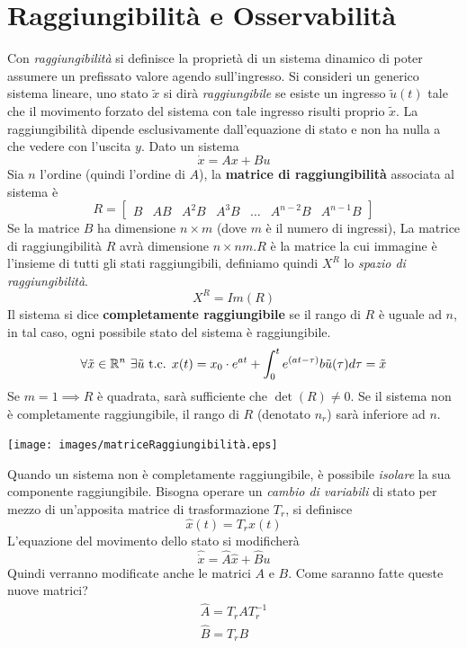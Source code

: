 \documentclass[10pt, letterpaper]{report}
\begin{document}
\section{Raggiungibilità e Osservabilità}
 Con \textit{raggiungibilità} si definisce la proprietà di un sistema dinamico 
di poter assumere un prefissato valore agendo sull'ingresso. \acc 
Si consideri un generico sistema lineare, uno stato $\tilde x$ si dirà \textit{raggiungibile} se 
esiste un ingresso $\tilde u(t)$ tale che il movimento forzato del sistema con tale 
ingresso risulti proprio $\tilde x$. La raggiungibilità dipende esclusivamente dall'equazione di stato e non ha 
nulla a che vedere con l'uscita $y$.\acc 
Dato un sistema $$ \dot{x}=Ax+Bu$$
Sia $n$ l'ordine (quindi l'ordine di $A$), la \textbf{matrice di raggiungibilità} associata al sistema è 
$$ R=\begin{bmatrix}
    B&AB&A^2B&A^3 B &\dots & A^{n-2}B & A^{n-1}B
\end{bmatrix}$$
Se la matrice $B$ ha dimensione $n\times m$ (dove $m$ è il numero di 
ingressi), La matrice di raggiungibilità $R$ avrà dimensione $n\times nm$.$R$ è la matrice 
la cui immagine è l'insieme di tutti gli stati raggiungibili, definiamo quindi $X^R$ lo \textit{spazio di 
raggiungibilità}. $$ X^R=Im(R)$$ 
Il sistema si dice \textbf{completamente raggiungibile} se il rango di $R$ è uguale ad $n$, in tal caso, 
ogni possibile stato del sistema è raggiungibile. 
$$ \forall \tilde x\in{\mathbb R}^n\ \exists \tilde u \text{ t.c. } x(t)=x_0\cdot e^{at}+\int_0^te^{(at-\tau)}b\tilde u(\tau)d\tau=\tilde x$$
Se $m=1\implies 
R$ è quadrata, sarà sufficiente che $\det(R)\ne 0$. Se il sistema non è completamente 
raggiungibile, il rango di $R$ (denotato $n_r$) sarà inferiore ad $n$.
\begin{center}
    \texttt{[image: images/matriceRaggiungibilità.eps]}
\end{center}
Quando un sistema non è completamente raggiungibile, è possibile 
\textit{isolare} la sua componente raggiungibile. Bisogna operare 
un \textit{cambio di variabili} di stato per mezzo di un'apposita matrice di 
trasformazione $T_r$, si definisce
$$\hat x(t) = T_rx(t) $$
L'equazione del movimento dello stato si modificherà 
$$ \hat{\dot{x}}=\hat A\hat x+\hat Bu $$
Quindi verranno modificate anche le matrici $A$ e $B$. Come saranno fatte queste nuove matrici?$$ \begin{matrix}
    \hat A = T_rAT_r^{-1}\\ 
    \hat B = T_r B
\end{matrix}$$
\end{document}
